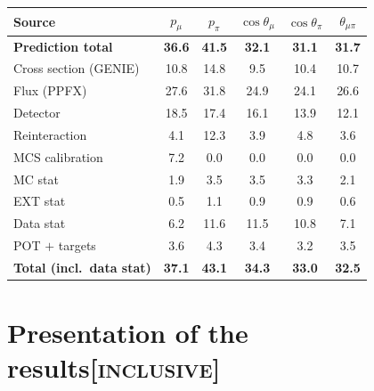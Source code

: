 \documentclass[11pt,a4paper]{article}
\newcommand{\scopetag}[1]{\hfill{\normalfont\small\textsc{[#1]}}}
\begin{document}
\begin{center}\scriptsize
{}
\label{tab:systbreak_comb}
\begin{tabular}{lccccc}
\toprule
Source & $p_\mu$ & $p_\pi$ & $\cos\theta_\mu$ & $\cos\theta_\pi$ & $\theta_{\mu\pi}$ \\
\midrule
\textbf{Prediction total} & \textbf{36.6} & \textbf{41.5} & \textbf{32.1} & \textbf{31.1} & \textbf{31.7} \\
Cross section (GENIE) & 10.8 & 14.8 & 9.5 & 10.4 & 10.7 \\
Flux (PPFX) & 27.6 & 31.8 & 24.9 & 24.1 & 26.6 \\
Detector & 18.5 & 17.4 & 16.1 & 13.9 & 12.1 \\
Reinteraction & 4.1 & 12.3 & 3.9 & 4.8 & 3.6 \\
MCS calibration & 7.2 & 0.0 & 0.0 & 0.0 & 0.0 \\
MC stat & 1.9 & 3.5 & 3.5 & 3.3 & 2.1 \\
EXT stat & 0.5 & 1.1 & 0.9 & 0.9 & 0.6 \\
Data stat & 6.2 & 11.6 & 11.5 & 10.8 & 7.1 \\
POT $+$ targets & 3.6 & 4.3 & 3.4 & 3.2 & 3.5 \\
\textbf{Total (incl.\ data stat)} & \textbf{37.1} & \textbf{43.1} & \textbf{34.3} & \textbf{33.0} & \textbf{32.5} \\
\bottomrule
\end{tabular}
\end{center}



\section[Presentation of the results]{Presentation of the results\scopetag{inclusive}}
\label{sec:supp_caveats}
\end{document}
